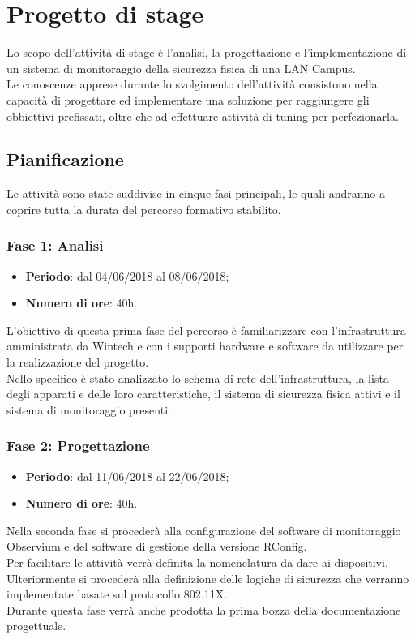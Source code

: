 \documentclass[Tesi.tex]{subfiles}
\begin{document}
\chapter{Progetto di stage}
Lo scopo dell'attività di stage è l’analisi, la progettazione e l'implementazione di un sistema di monitoraggio della sicurezza fisica di una LAN Campus. \\
Le conoscenze apprese durante lo svolgimento dell'attività consistono nella capacità di progettare ed implementare una soluzione per raggiungere gli obbiettivi prefissati, oltre che ad effettuare attività di tuning per perfezionarla.


\section{Pianificazione}
Le attività sono state suddivise in cinque fasi principali, le quali andranno a coprire tutta la durata del percorso formativo stabilito.

\subsection{Fase 1: Analisi}
\begin{itemize}
	\item \textbf{Periodo}: dal 04/06/2018 al 08/06/2018;
	\item \textbf{Numero di ore}: 40h.
\end{itemize}

L'obiettivo di questa prima fase del percorso è familiarizzare con l'infrastruttura amministrata da Wintech e con i supporti hardware e software da utilizzare per la realizzazione del progetto. \\
Nello specifico è stato analizzato lo schema di rete dell'infrastruttura, la lista degli apparati e delle loro caratteristiche, il sistema di sicurezza fisica attivi e il sistema di monitoraggio presenti. 

\subsection{Fase 2: Progettazione}
\begin{itemize}
	\item \textbf{Periodo}: dal 11/06/2018 al 22/06/2018;
	\item \textbf{Numero di ore}: 40h.
\end{itemize}
	
Nella seconda fase si procederà alla configurazione del software di monitoraggio Observium e del software di gestione della versione RConfig. \\
Per facilitare le attività verrà definita la nomenclatura da dare ai dispositivi.\\
Ulteriormente si procederà alla definizione delle logiche di sicurezza che verranno implementate basate sul protocollo 802.11X. \\
Durante questa fase verrà anche prodotta la prima bozza della documentazione progettuale.
	
\end{document}
